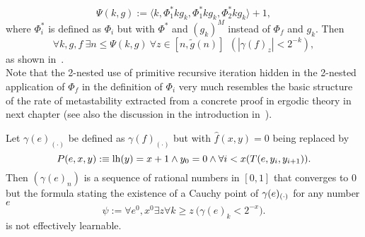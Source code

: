 \begin{rmk}
\[
\Psi(k,g):=\langle k,\Phi^*_1 kg_k,\Phi^*_1 kg_k,\Phi^*_2 kg_k\rangle+1,
\]
where $\Phi^*_i$ is defined as $\Phi_i$ but with $\Phi^*$ and $(g_k)^{M}$ instead of $\Phi_f$ and $g_k$.
Then
\[
\forall k,g,f\ \exists n\leq \Psi(k,g)\ \forall z\in[n,\tilde g(n)]\ \ (|\gamma(f)_z| < 2^{-k}), \] 
as shown in~\cite{KS13}.\\
Note that the 2-nested use of primitive recursive iteration hidden in the 
2-nested application of 
$\Phi_f$ in the definition of $\Phi_i$ very much resembles the basic 
structure of the rate of metastability extracted from a concrete proof 
in ergodic theory in next chapter (see also the discussion in the introduction in~\cite{Safarik(11)}).
\end{rmk}

\begin{cor}\label{c:gammae}
Let $\gamma(e)_{(\cdot)}$ be defined as $\gamma(f)_{(\cdot)}$ but 
with $\widehat{f}(x,y)=0$ being replaced by 
\[ P(e,x,y):\equiv \mbox{\rm lh} (y)=x+1\wedge y_0=0\wedge\forall i<x(T(e,y_i,y_{i+1})).\]  
Then $(\gamma(e)_n)$ is a sequence of rational numbers in $[0,1]$ that 
converges to $0$ but 
the formula stating the existence of a Cauchy point of 
$\gamma(e)_{(\cdot)}$ for any number $e$  
\[
\psi:=\forall e^0,x^0\exists z \forall k\geq z\ \big( \gamma(e)_k<2^{-x} \big).
\]
is not effectively learnable.
\end{cor}

